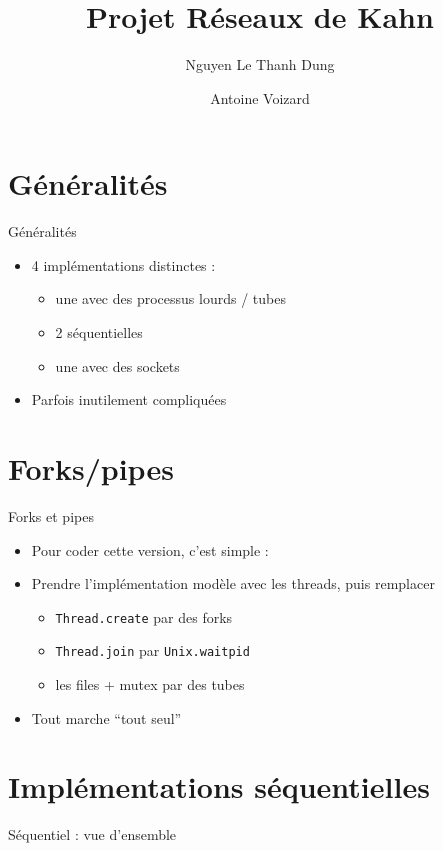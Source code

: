 \documentclass[xetex]{beamer}
\title{Projet Réseaux de Kahn}
\author[Nguyen, Voizard]{Nguyen Le Thanh Dung \and Antoine Voizard}
\institute[ENS]{\'Ecole Normale Supérieure}
\begin{document}
\begin{frame}
  \titlepage
\end{frame}


\section{Généralités}

\begin{frame}{Généralités}
  \begin{itemize}
  \item 4 implémentations distinctes :
    \begin{itemize}
    \item une avec des processus lourds / tubes
    \item 2 séquentielles
    \item une avec des sockets
    \end{itemize}
  \item Parfois inutilement compliquées
  \end{itemize}
\end{frame}

\section{Forks/pipes}

\begin{frame}{Forks et pipes}
  \begin{itemize}
  \item Pour coder cette version, c'est simple :
  \item Prendre l'implémentation modèle avec les threads, puis remplacer
    \begin{itemize}
    \item \texttt{Thread.create} par des forks
    \item \texttt{Thread.join} par \texttt{Unix.waitpid}
    \item les files + mutex par des tubes
    \end{itemize}
  \item Tout marche ``tout seul''
  \end{itemize}
\end{frame}

\section{Implémentations séquentielles}

\begin{frame}{Séquentiel : vue d'ensemble}
  
\end{frame}
\end{document}
